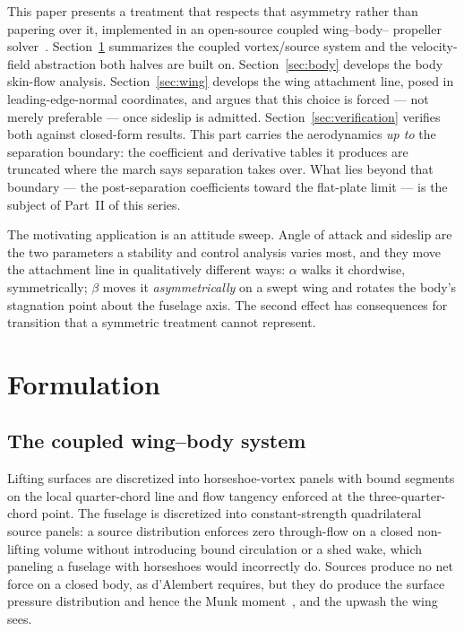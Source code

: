 \documentclass[submit]{aiaa-tc}%
\begin{document}
This paper presents a treatment that respects that asymmetry rather than
papering over it, implemented in an open-source coupled wing--body--
propeller solver~\cite{aeolion2026}. Section~\ref{sec:formulation}
summarizes the coupled vortex/source system and the velocity-field
abstraction both halves are built on. Section~\ref{sec:body} develops the
body skin-flow analysis. Section~\ref{sec:wing} develops the wing
attachment line, posed in leading-edge-normal coordinates, and argues that
this choice is forced --- not merely preferable --- once sideslip is
admitted. Section~\ref{sec:verification} verifies both against closed-form
results. This part carries the aerodynamics \emph{up to} the separation
boundary: the coefficient and derivative tables it produces are
truncated where the march says separation takes over. What lies beyond
that boundary --- the post-separation coefficients toward the
flat-plate limit --- is the subject of Part~II of this series.

The motivating application is an attitude sweep. Angle of attack and
sideslip are the two parameters a stability and control analysis varies
most, and they move the attachment line in qualitatively different ways:
$\alpha$ walks it chordwise, symmetrically; $\beta$ moves it
\emph{asymmetrically} on a swept wing and rotates the body's stagnation
point about the fuselage axis. The second effect has consequences for
transition that a symmetric treatment cannot represent.

\section{Formulation}
\label{sec:formulation}

\subsection{The coupled wing--body system}

Lifting surfaces are discretized into horseshoe-vortex panels with bound
segments on the local quarter-chord line and flow tangency enforced at the
three-quarter-chord point. The fuselage is discretized into
constant-strength quadrilateral source panels: a source distribution
enforces zero through-flow on a closed non-lifting volume without
introducing bound circulation or a shed wake, which paneling a fuselage
with horseshoes would incorrectly do. Sources produce no net force on a
closed body, as d'Alembert requires, but they do produce the surface
pressure distribution and hence the Munk moment~\cite{munk1924}, and the
upwash the wing sees.
\end{document}
